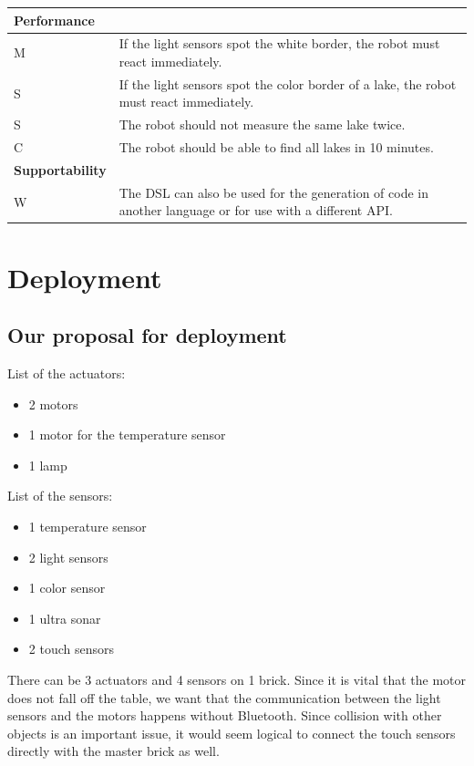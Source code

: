\documentclass[11pt,a4paper]{article}
\begin{document}
\begin{tabular}{|p{5cm}|p{10cm}|}
  \textbf{Performance}&\\
\hline
M & If the light sensors spot the white border, the robot must react immediately.\\
S & If the light sensors spot the color border of a lake, the robot must react immediately.\\
S & The robot should not measure the same lake twice.\\
C & The robot should be able to find all lakes in 10 minutes. \\

\hline
   \textbf{Supportability}&\\
\hline
W & The DSL can also be used for the generation of code in another language or for use with a different API.\\
\hline
\end{tabular}

\pagebreak 
\section{Deployment}
\subsection{Our proposal for deployment}
List of the actuators:
\begin{itemize}
\item 2 motors
\item 1 motor for  the temperature sensor
\item 1 lamp
\end{itemize}

\noindent List of the sensors:
\begin{itemize}
\item 1 temperature sensor
\item 2 light sensors
\item 1 color sensor
\item 1 ultra sonar
\item 2 touch sensors
\end{itemize}

There can be 3 actuators and 4 sensors on 1 brick.
Since it is vital that the motor does not fall off the table, we want that the communication between the light sensors and the motors happens without Bluetooth. Since collision with other objects is an important issue, it would seem logical to connect the touch sensors directly with the master brick as well.\\ 
\end{document}
